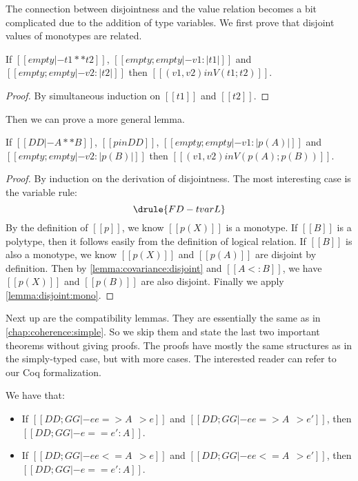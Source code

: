 The connection between disjointness and the value relation becomes a bit
complicated due to the addition of type variables. We first prove that disjoint
values of monotypes are related.


\begin{lemma} \label{lemma:disjoint:mono}
  If $[[empty |- t1 ** t2]]$,
  $[[  empty ; empty |-  v1 : |t1|  ]]$ and
  $[[  empty ; empty |-  v2 : |t2|  ]]$
  then $[[   (v1, v2) in V ( t1 ; t2  )    ]]$.
\end{lemma}
\begin{proof}
  By simultaneous induction on $[[t1]]$ and $[[t2]]$.
\end{proof}

Then we can prove a more general lemma.

\begin{lemma}
  If $[[DD |- A ** B]]$, $[[ p in DD  ]]$, $[[  empty ; empty |-  v1 : |p (A)|  ]]$ and $[[  empty ; empty |-  v2 : |p (B)|  ]]$
  then $[[   (v1, v2) in V ( p(A) ; p(B)  )    ]]$.
\end{lemma}
\begin{proof}
  By induction on the derivation of disjointness. The most interesting case is the variable rule:
  \[
    \drule{FD-tvarL}
  \]
  By the definition of $[[p]]$, we know $[[p(X)]]$ is a monotype. If $[[B]]$ is
  a polytype, then it follows easily from the definition of logical relation. If
  $[[B]]$ is also a monotype, we know $[[p(X)]]$ and $[[p(A)]]$ are disjoint by
  definition. Then by \cref{lemma:covariance:disjoint} and $[[A <: B]]$,
  we have $[[p(X)]]$ and $[[p(B)]]$ are also disjoint. Finally we apply
  \cref{lemma:disjoint:mono}.
\end{proof}


Next up are the compatibility lemmas. They are essentially the same as in
\cref{chap:coherence:simple}. So we skip them and state the last two important
theorems without giving proofs. The proofs have mostly the same structures as in the
simply-typed case, but with more cases. The interested reader can refer to our
Coq formalization.

\begin{theorem} We have that:
  \begin{itemize}
  \item If $[[DD; GG |- ee => A ~~> e]]$ and $[[DD; GG |- ee => A ~~> e']]$, then $[[DD; GG |- e == e' : A ]]$.
  \item If $[[DD ; GG |- ee <= A ~~> e]]$ and $[[DD ; GG |- ee <= A ~~> e']]$, then $[[DD; GG |- e == e' : A ]]$.
  \end{itemize}
\end{theorem}

